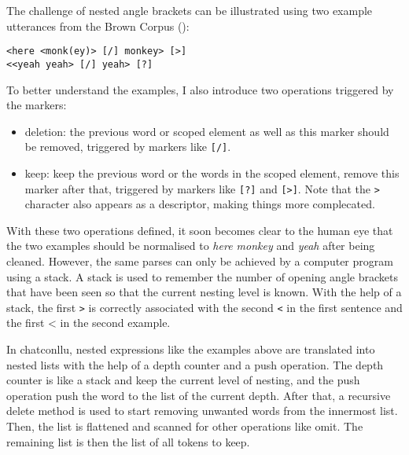 The challenge of nested angle brackets can be illustrated using two example utterances from the Brown Corpus (\cite{brown1973}):

\texttt{<here <monk(ey)> [/] monkey> [>]}\\  %
\texttt{<<yeah yeah> [/] yeah> [?]} %

To better understand the examples, I also introduce two operations triggered by the markers:
\begin{itemize}
	\item deletion: the previous word or scoped element as well as this marker should be removed, triggered by markers like \texttt{[/]}.
	\item keep: keep the previous word or the words in the scoped element, remove this marker after that, triggered by markers like \texttt{[?]} and \texttt{[>]}. Note that the \texttt{>} character also appears as a descriptor, making things more complecated.
\end{itemize}

With these two operations defined, it soon becomes clear to the human eye that the two examples should be normalised to \emph{here monkey} and \emph{yeah} after being cleaned. However, the same parses can only be achieved by a computer program using a stack. A stack is used to remember the number of opening angle brackets that have been seen so that the current nesting level is known. With the help of a stack, the first \texttt{>} is correctly associated with the second \texttt{<} in the first sentence and the first {<} in the second example.

In chatconllu, nested expressions like the examples above are translated into nested lists with the help of a depth counter and a push operation. The depth counter is like a stack and keep the current level of nesting, and the push operation push the word to the list of the current depth. After that, a recursive delete method is used to start removing unwanted words from the innermost list. Then, the list is flattened and scanned for other operations like omit. The remaining list is then the list of all tokens to keep.

